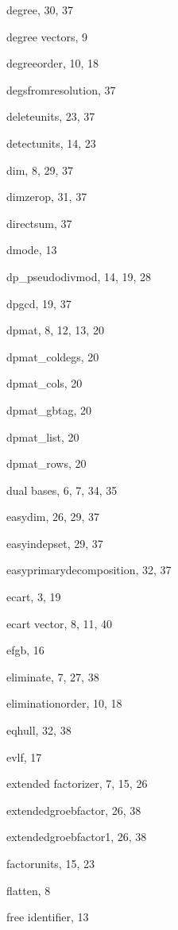 \begin{theindex}
  \item degree, 30, 37
  \item degree vectors, 9
  \item degreeorder, 10, 18
  \item degsfromresolution, 37
  \item deleteunits, 23, 37
  \item detectunits, 14, 23
  \item dim, 8, 29, 37
  \item dimzerop, 31, 37
  \item directsum, 37
  \item dmode, 13
  \item dp\_pseudodivmod, 14, 19, 28
  \item dpgcd, 19, 37
  \item dpmat, 8, 12, 13, 20
  \item dpmat\_coldegs, 20
  \item dpmat\_cols, 20
  \item dpmat\_gbtag, 20
  \item dpmat\_list, 20
  \item dpmat\_rows, 20
  \item dual bases, 6, 7, 34, 35

  \indexspace

  \item easydim, 26, 29, 37
  \item easyindepset, 29, 37
  \item easyprimarydecomposition, 32, 37
  \item ecart, 3, 19
  \item ecart vector, 8, 11, 40
  \item efgb, 16
  \item eliminate, 7, 27, 38
  \item eliminationorder, 10, 18
  \item eqhull, 32, 38
  \item evlf, 17
  \item extended \gr factorizer, 7, 15, 26
  \item extendedgroebfactor, 26, 38
  \item extendedgroebfactor1, 26, 38

  \indexspace

  \item factorunits, 15, 23
  \item flatten, 8
  \item free identifier, 13

  \indexspace


\end{theindex}
